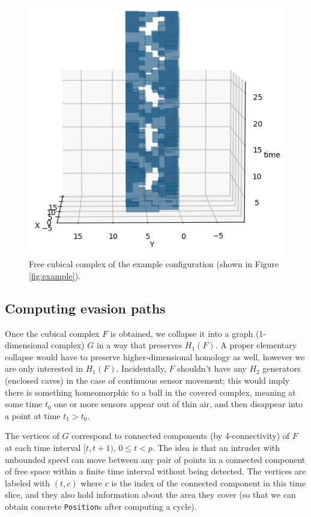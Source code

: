 \documentclass{article}
\begin{document}
\begin{figure}[H]
  \centering
  \includegraphics[width=0.7\linewidth]{example_cubical_complex.png}
  \caption{Free cubical complex of the example configuration (shown in Figure \ref{fig:example}).}
  \label{fig:example_cub_complex}
\end{figure}


\subsection{Computing evasion paths}

Once the cubical complex $F$ is obtained,
we collapse it into a graph (1-dimensional complex) $G$ in a way that preserves $H_1(F)$.
A proper elementary collapse would have to preserve higher-dimensional homology as well, however we are only interested in $H_1(F)$.
Incidentally, $F$ shouldn't have any $H_2$ generators (enclosed caves) in the case of continuous sensor movement; this would imply there is something homeomorphic to a ball in the covered complex, meaning at some time $t_0$ one or more sensors appear out of thin air, and then disappear into a point at time $t_1 > t_0$.

The vertices of $G$ correspond to connected components (by 4-connectivity) of $F$ at each time interval $[t, t + 1)$, $0 \leq t < p$.
The idea is that an intruder with unbounded speed can move between any pair of points in a connected component of free space within a finite time interval without being detected.
The vertices are labeled with $(t, c)$ where $c$ is the index of the connected component in this time slice,
and they also hold information about the area they cover (so that we can obtain concrete \texttt{Position}s after computing a cycle).
\end{document}
